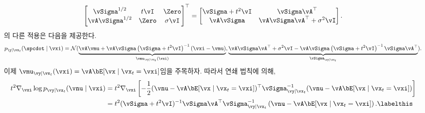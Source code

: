 \documentclass[../../book-main_ko.tex]{subfiles}
\begin{document}
\begin{example}
\begin{equation*}
    \begin{bmatrix}
      \vSigma^{1/2} & t\vI & \Zero \\
      \vA \vSigma^{1/2} & \Zero & \sigma \vI
    \end{bmatrix}^\top
    = 
    \begin{bmatrix}
      \vSigma + t^2\vI & \vSigma\vA^\top \\
      \vA\vSigma & \vA\vSigma\vA^\top + \sigma^2 \vI
    \end{bmatrix}.
  \end{equation*}
  의 다른 적용은 다음을 제공한다.
  \begin{equation}
    p_{\y \mid \vx_t}(\spcdot \mid \vxi) = \mathcal{N}(
      \underbrace{%
      \vA\vmu + \vA\vSigma\left( \vSigma + t^2 \vI \right)^{-1}
      \left(
        \vxi - \vmu
      \right)
      }_{\vmu_{\vy \mid \vx_t}(\vxi)}, 
      \underbrace{%
      \vA\vSigma\vA^\top + \sigma^2 \vI - \vA\vSigma \left( \vSigma
      + t^2 \vI\right)^{-1} \vSigma \vA^\top
      }_{\vSigma_{\vy\mid \vx_t}}
    ).
  \end{equation}
  이제 $\vmu_{\vy \mid \vx_t}(\vxi) = \vA \bE[\vx \mid \vx_t=\vxi]$임을 주목하자.
  따라서 연쇄 법칙에 의해,
  \begin{align*}
    t^2 \nabla_{\vxi} \log p_{\vy \mid \vx_t}(\vnu \mid \vxi)
    &= 
    t^2 \nabla_{\vxi}\left[
      -\frac{1}{2}
      (\vnu - \vA \bE[\vx \mid \vx_t=\vxi])^\top
      \vSigma_{\vy \mid \vx_t}^{-1}
      (\vnu - \vA \bE[\vx \mid \vx_t=\vxi])
    \right]
    \\
    &= t^2 (\vSigma+t^2 \vI)^{-1}\vSigma\vA^\top\vSigma_{\vy \mid \vx_t}^{-1}\left(
    \vnu - \vA \bE[\vx \mid \vx_t=\vxi] \right).
    \labelthis \label{eq:conditional-posterior-measurementmatching-gaussian-case-dps-approx}
  \end{align*} 


\end{example}
\end{document}
